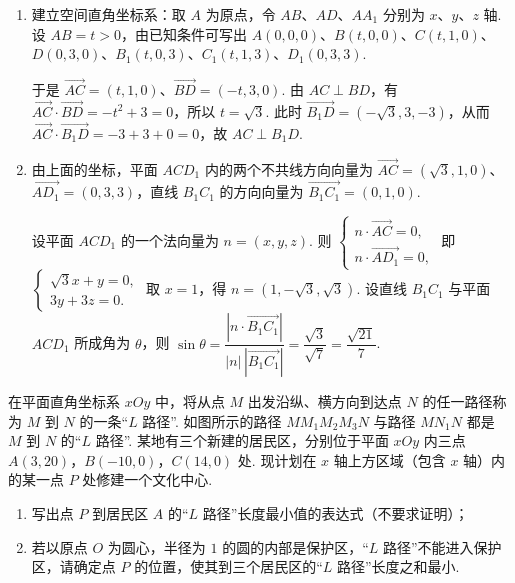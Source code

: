 \begin{solution}
\begin{enumerate}
\item 建立空间直角坐标系：取 \(A\) 为原点，令 \(AB\)、\(AD\)、\(AA_{1}\) 分别为 \(x\)、\(y\)、\(z\) 轴. 设 \(AB=t>0\)，由已知条件可写出
\(A(0,0,0)\)、\(B(t,0,0)\)、\(C(t,1,0)\)、\(D(0,3,0)\)、\(B_{1}(t,0,3)\)、\(C_{1}(t,1,3)\)、\(D_{1}(0,3,3)\).

于是 \(\overrightarrow{AC}=(t,1,0)\)、\(\overrightarrow{BD}=(-t,3,0)\). 由 \(AC\perp BD\)，有
\(\overrightarrow{AC}\cdot\overrightarrow{BD}=-t^{2}+3=0\)，所以 \(t=\sqrt{3}\). 此时
\(\overrightarrow{B_{1}D}=(-\sqrt{3},3,-3)\)，从而
\(\overrightarrow{AC}\cdot\overrightarrow{B_{1}D}=-3+3+0=0\)，故 \(AC\perp B_{1}D\).

\item 由上面的坐标，平面 \(ACD_{1}\) 内的两个不共线方向向量为
\(\overrightarrow{AC}=(\sqrt{3},1,0)\)、\(\overrightarrow{AD_{1}}=(0,3,3)\)，直线 \(B_{1}C_{1}\) 的方向向量为 \(\overrightarrow{B_{1}C_{1}}=(0,1,0)\).

设平面 \(ACD_{1}\) 的一个法向量为 \(n=(x,y,z)\). 则
\(\begin{cases}
n\cdot\overrightarrow{AC}=0,\\
n\cdot\overrightarrow{AD_{1}}=0,
\end{cases}\)
即
\(\begin{cases}
\sqrt{3}x+y=0,\\
3y+3z=0.
\end{cases}\)
取 \(x=1\)，得 \(n=(1,-\sqrt{3},\sqrt{3})\). 设直线 \(B_{1}C_{1}\) 与平面 \(ACD_{1}\) 所成角为 \(\theta\)，则
\(\sin\theta=\dfrac{|n\cdot\overrightarrow{B_{1}C_{1}}|}{|n|\,|\overrightarrow{B_{1}C_{1}}|}=\dfrac{\sqrt{3}}{\sqrt{7}}=\dfrac{\sqrt{21}}{7}\).
\end{enumerate}
\end{solution}

\begin{problem}
在平面直角坐标系 \(xOy\) 中，将从点 \(M\) 出发沿纵、横方向到达点 \(N\) 的任一路径称为 \(M\) 到 \(N\) 的一条“\(L\) 路径”. 如图所示的路径 \(MM_{1}M_{2}M_{3}N\) 与路径 \(MN_{1}N\) 都是 \(M\) 到 \(N\) 的“\(L\) 路径”. 某地有三个新建的居民区，分别位于平面 \(xOy\) 内三点 \(A(3,20)\)，\(B(-10,0)\)，\(C(14,0)\) 处. 现计划在 \(x\) 轴上方区域（包含 \(x\) 轴）内的某一点 \(P\) 处修建一个文化中心.
\begin{enumerate}
\item 写出点 \(P\) 到居民区 \(A\) 的“\(L\) 路径”长度最小值的表达式（不要求证明）；
\item 若以原点 \(O\) 为圆心，半径为 \(1\) 的圆的内部是保护区，“\(L\) 路径”不能进入保护区，请确定点 \(P\) 的位置，使其到三个居民区的“\(L\) 路径”长度之和最小.
\end{enumerate}
\end{problem}


